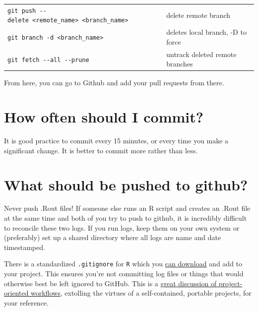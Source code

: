 \documentclass[]{book}
\begin{document}
\begin{longtable}[]{@{}ll@{}}
\begin{minipage}[t]{0.34\columnwidth}
\texttt{git\ push\ -\/-delete\ \textless{}remote\_name\textgreater{}\ \textless{}branch\_name\textgreater{}}\strut
\end{minipage} & \begin{minipage}[t]{0.60\columnwidth}\raggedright
delete remote branch\strut
\end{minipage}\tabularnewline
\begin{minipage}[t]{0.34\columnwidth}\raggedright
\texttt{git\ branch\ -d\ \textless{}branch\_name\textgreater{}}\strut
\end{minipage} & \begin{minipage}[t]{0.60\columnwidth}\raggedright
deletes local branch, -D to force\strut
\end{minipage}\tabularnewline
\begin{minipage}[t]{0.34\columnwidth}\raggedright
\texttt{git\ fetch\ -\/-all\ -\/-prune}\strut
\end{minipage} & \begin{minipage}[t]{0.60\columnwidth}\raggedright
untrack deleted remote branches\strut
\end{minipage}\tabularnewline
\bottomrule
\end{longtable}

From here, you can go to Github and add your pull requests from there.

\hypertarget{how-often-should-i-commit}{%
\section{How often should I commit?}\label{how-often-should-i-commit}}

It is good practice to commit every 15 minutes, or every time you make a significant change. It is better to commit more rather than less.

\hypertarget{what-should-be-pushed-to-github}{%
\section{What should be pushed to github?}\label{what-should-be-pushed-to-github}}

Never push .Rout files! If someone else runs an R script and creates an .Rout file at the same time and both of you try to push to github, it is incredibly difficult to reconcile these two logs. If you run logs, keep them on your own system or (preferably) set up a shared directory where all logs are name and date timestamped.

There is a standardized \texttt{.gitignore} for \texttt{R} which you \href{https://github.com/github/gitignore/blob/master/R.gitignore}{can download} and add to your project. This ensures you're not committing log files or things that would otherwise best be left ignored to GitHub. This is a \href{https://www.tidyverse.org/articles/2017/12/workflow-vs-script/}{great discussion of project-oriented workflows}, extolling the virtues of a self-contained, portable projects, for your reference.
\end{document}
